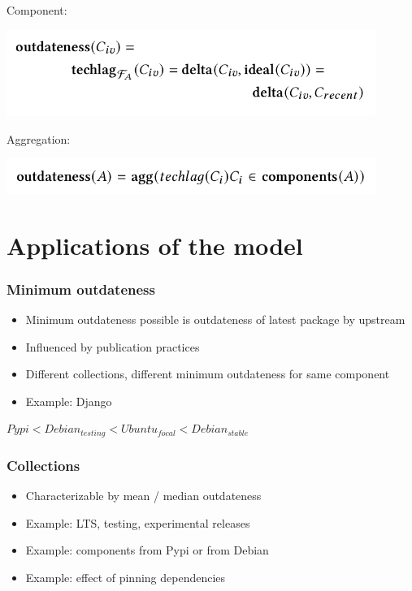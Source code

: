 \documentclass[17pt,aspectratio=169,hyperref={pdfusetitle,colorlinks,allcolors=olive}]{beamer}
\begin{document}
\begin{frame}[fragile]

  Component:
  \begin{center}
  \includegraphics[width=12cm]{figs/outdateness-techlag}
  \end{center}

  Aggregation:
  \begin{center}
  \includegraphics[width=12cm]{figs/outdateness-aggregation}
  \end{center}

  
\end{frame}


\section{Applications of the model}

\begin{frame}[fragile]
  \frametitle{Minimum outdateness}
  
\begin{itemize}
\item Minimum outdateness possible is outdateness of latest package by upstream
\item Influenced by publication practices
\item Different collections, different minimum outdateness for same component
\item Example: Django
\end{itemize}

{\small $Pypi < Debian_{testing} < Ubuntu_{focal} < Debian_{stable}$}

\end{frame}


\begin{frame}[fragile]
  \frametitle{Collections}

  \begin{itemize}
  \item Characterizable by mean / median outdateness
  \item Example: LTS, testing, experimental releases
  \item Example: components from Pypi or from Debian
  \item Example: effect of pinning dependencies
  \end{itemize}
\end{frame}
\end{document}

